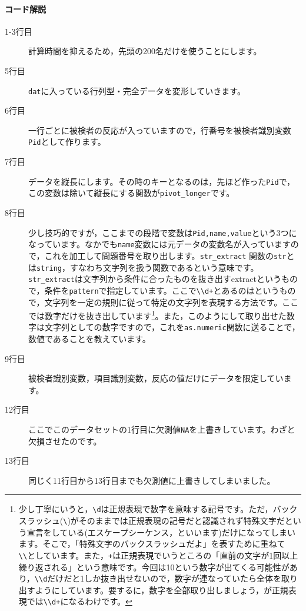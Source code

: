 \documentclass{ltjsbook}
\begin{document}
\paragraph{コード解説}
\begin{description}
	\item[1-3行目] 計算時間を抑えるため，先頭の200名だけを使うことにします。
	\item[5行目] \verb|dat|に入っている行列型・完全データを変形していきます。
	\item[6行目] 一行ごとに被検者の反応が入っていますので，行番号を被検者識別変数\verb|Pid|として作ります。
	\item[7行目] データを縦長にします。その時のキーとなるのは，先ほど作った\verb|Pid|で，この変数は除いて縦長にする関数が\verb|pivot_longer|です。
	\item[8行目] 少し技巧的ですが，ここまでの段階で変数は\verb|Pid,name,value|という3つになっています。なかでも\verb|name|変数には元データの変数名が入っていますので，これを加工して問題番号を取り出します。\verb|str_extract| 関数の\verb|str|とは\verb|string|，すなわち文字列を扱う関数であるという意味です。\verb|str_extract|は文字列から条件に合ったものを抜き出すextractというもので，条件を\verb|pattern|で指定しています。ここで\verb|\\d+|とあるのはというもので，文字列を一定の規則に従って特定の文字列を表現する方法です。ここでは数字だけを抜き出しています\footnote{少し丁寧にいうと，\verb|\d|は正規表現で数字を意味する記号です。ただ，バックスラッシュ(\verb|\|)がそのままでは正規表現の記号だと認識されず特殊文字だという宣言をしている(エスケープシーケンス，といいます)だけになってしまいます。そこで，「特殊文字のバックスラッシュだよ」を表すために重ねて\verb|\\|としています。また，\verb|+|は正規表現でいうところの「直前の文字が1回以上繰り返される」という意味です。今回は10という数字が出てくる可能性があり，\verb|\\d|だけだと1しか抜き出せないので，数字が連なっていたら全体を取り出すようにしています。要するに，数字を全部取り出しましょう，が正規表現では\verb|\\d+|になるわけです。}。また，このようにして取り出せた数字は文字列としての数字ですので，これを\verb|as.numeric|関数に送ることで，数値であることを教えています。
	\item[9行目] 被検者識別変数，項目識別変数，反応の値だけにデータを限定しています。
	\item[12行目] ここでこのデータセットの1行目に欠測値\verb|NA|を上書きしています。わざと欠損させたのです。
	\item[13行目] 同じく11行目から13行目までも欠測値に上書きしてしまいました。
\end{description}
\end{document}
